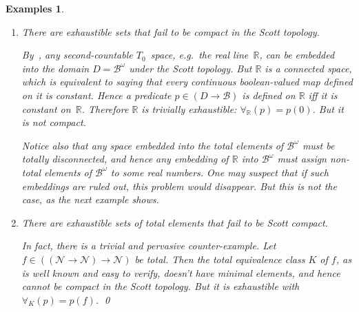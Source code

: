 \documentclass{LMCS}
\newcommand{\myomega}{\omega}
\newtheorem{Examples}[thm]{Examples}
\newenvironment{examples}{\begin{Examples}}{\end{Examples}}
\newcommand{\R}{\mathbb{R}}
\newcommand{\pN}{\mathcal{N}}
\newcommand{\pBool}{\mathcal{B}}
\newcommand{\D}{D}
\begin{document}
\pagebreak[3]
\begin{examples} \leavevmode
\label{counter:example} 
\begin{enumerate}
\item \label{counter:example:1} \emph{There are exhaustible sets that
    fail to be compact in the Scott topology.}

  \medskip
  \noindent
  By~\cite{scott:datatypes,plotkin:tomega}, any second-countable
  $T_0$~space, e.g.\ the real line~$\R$, can be embedded into the
  domain $\D=\pBool^\myomega$ under the Scott topology. But $\R$ is a
  connected space, which is equivalent to saying that every continuous
  boolean-valued map defined on it is constant. Hence a predicate $p
  \in (\D \to \pBool)$ is defined on $\R$ iff it is constant on~$\R$.
  Therefore $\R$ is trivially exhaustible: $\forall_{\R}(p)=p(0)$.
  But it is not compact.

  Notice also that any space embedded into the total elements of
  $\pBool^\myomega$ must be totally disconnected, and hence any
  embedding of $\R$ into $\pBool^\myomega$ must assign non-total
  elements of $\pBool^\myomega$ to some real numbers. One may suspect
  that if such embeddings are ruled out, this problem would disappear.
  But this is not the case, as the next example shows.

\item \label{counter:example:2} \emph{There are exhaustible sets of
    total elements that fail to be Scott compact.}

  \medskip
  \noindent
  In fact, there is a trivial and pervasive counter-example. Let $f
  \in ((\pN \to \pN) \to \pN)$ be total.  Then the total equivalence
  class $K$ of $f$, as is well known and easy to verify, doesn't have
  minimal elements, and hence cannot be compact in the Scott topology.
  But it is exhaustible with $\forall_K(p)=p(f)$.  \qed
\end{enumerate}
\end{examples}
\end{document}
